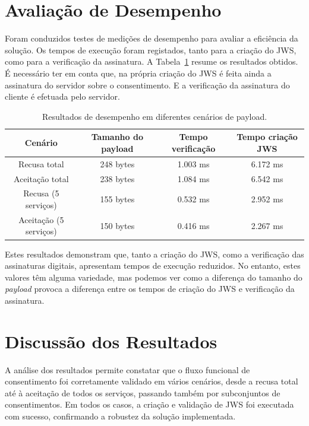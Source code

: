 \section{Avaliação de Desempenho}

Foram conduzidos testes de medições de desempenho para avaliar a eficiência da solução. Os tempos de execução foram registados, tanto para a criação do JWS, como para a verificação da assinatura. A Tabela~\ref{tab:performance} resume os resultados obtidos.
É necessário ter em conta que, na própria criação do JWS é feita ainda a assinatura do servidor sobre o consentimento. E a verificação da assinatura do cliente é efetuada pelo servidor.

\begin{table}[h]
    \centering
    \caption{Resultados de desempenho em diferentes cenários de payload.}
    \label{tab:performance}
    \begin{tabular}{|c|c|c|c|}
        \hline
        \textbf{Cenário} & \textbf{Tamanho do payload} & \textbf{Tempo verificação} & \textbf{Tempo criação JWS} \\ \hline
        Recusa total   & 248 bytes & 1.003 ms & 6.172 ms \\ \hline
        Aceitação total & 238 bytes & 1.084 ms & 6.542 ms \\ \hline
        Recusa (5 serviços) & 155 bytes & 0.532 ms & 2.952 ms \\ \hline
        Aceitação (5 serviços) & 150 bytes & 0.416 ms & 2.267 ms \\ \hline
    \end{tabular}
\end{table}

Estes resultados demonstram que, tanto a criação do JWS, como a verificação das assinaturas digitais, apresentam tempos de execução reduzidos. No entanto, estes valores têm alguma variedade, mas podemos ver como a diferença do tamanho do \textit{payload} provoca a diferença entre os tempos de criação do JWS e verificação da assinatura.

\section{Discussão dos Resultados}

A análise dos resultados permite constatar que o fluxo funcional de consentimento foi corretamente validado em vários cenários, desde a recusa total até à aceitação de todos os serviços, passando também por subconjuntos de consentimentos. Em todos os casos, a criação e validação de JWS foi executada com sucesso, confirmando a robustez da solução implementada.

